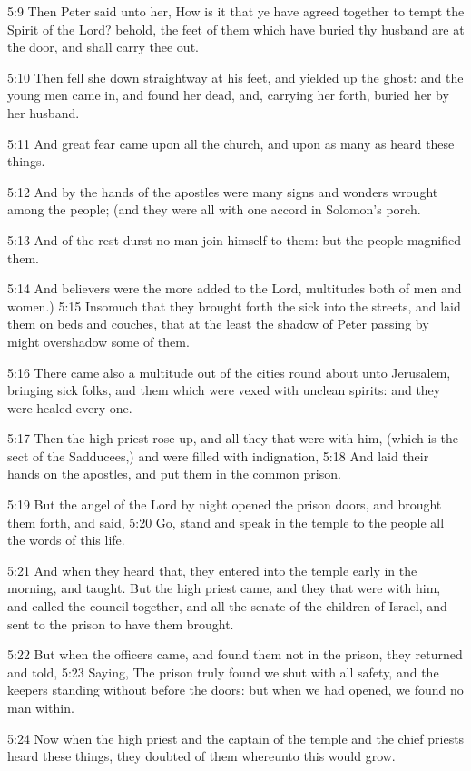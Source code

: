 5:9 Then Peter said unto her, How is it that ye have agreed together to tempt the Spirit of the Lord? behold, the feet of them which have buried thy husband are at the door, and shall carry thee out.

5:10 Then fell she down straightway at his feet, and yielded up the ghost: and the young men came in, and found her dead, and, carrying her forth, buried her by her husband.

5:11 And great fear came upon all the church, and upon as many as heard these things.

5:12 And by the hands of the apostles were many signs and wonders wrought among the people; (and they were all with one accord in Solomon's porch.

5:13 And of the rest durst no man join himself to them: but the people magnified them.

5:14 And believers were the more added to the Lord, multitudes both of men and women.)  5:15 Insomuch that they brought forth the sick into the streets, and laid them on beds and couches, that at the least the shadow of Peter passing by might overshadow some of them.

5:16 There came also a multitude out of the cities round about unto Jerusalem, bringing sick folks, and them which were vexed with unclean spirits: and they were healed every one.

5:17 Then the high priest rose up, and all they that were with him, (which is the sect of the Sadducees,) and were filled with indignation, 5:18 And laid their hands on the apostles, and put them in the common prison.

5:19 But the angel of the Lord by night opened the prison doors, and brought them forth, and said, 5:20 Go, stand and speak in the temple to the people all the words of this life.

5:21 And when they heard that, they entered into the temple early in the morning, and taught. But the high priest came, and they that were with him, and called the council together, and all the senate of the children of Israel, and sent to the prison to have them brought.

5:22 But when the officers came, and found them not in the prison, they returned and told, 5:23 Saying, The prison truly found we shut with all safety, and the keepers standing without before the doors: but when we had opened, we found no man within.

5:24 Now when the high priest and the captain of the temple and the chief priests heard these things, they doubted of them whereunto this would grow.

